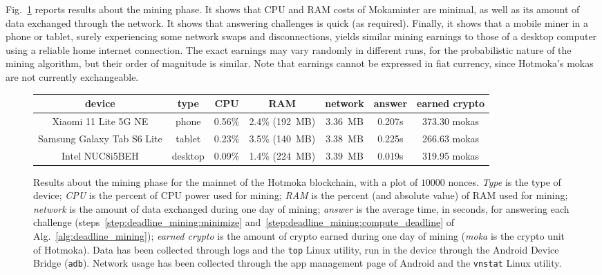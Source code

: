Fig.~\ref{fig:mining_phase_experiments} reports results about the mining phase.
It shows that CPU and RAM costs of Mokaminter are minimal, as well as its
amount of data exchanged through the network. It shows that answering challenges is quick (as required).
Finally, it shows that a mobile miner in a phone or tablet, surely experiencing some network swaps
and disconnections, yields similar mining earnings to those
of a desktop computer using a reliable home internet connection.
The exact earnings may vary
randomly in different runs, for the probabilistic
nature of the mining algorithm, but their order of magnitude is similar.
Note that earnings cannot be expressed in fiat
currency, since Hotmoka's mokas are not currently exchangeable.


\begin{figure}[t]
  \begin{center}
    \begin{tabular}{|c|c||c|c|c|c|c|}
      \hline
      \textbf{device} & \textbf{type} & \textbf{CPU} & \textbf{RAM} & \textbf{network} & \textbf{answer} & \textbf{earned crypto} \\\hline\hline
      Xiaomi 11 Lite 5G NE & phone & 0.56\% & 2.4\% (192~MB) & 3.36~MB & 0.207s & 373.30 mokas \\\hline
      Samsung Galaxy Tab S6 Lite & tablet & 0.23\% & 3.5\% (140~MB) & 3.38~MB & 0.225s & 266.63 mokas \\\hline
      Intel NUC8i5BEH & desktop & 0.09\% & 1.4\% (224~MB) & 3.39~MB & 0.019s & 319.95 mokas \\\hline
    \end{tabular}
  \end{center}
  \caption{Results about the mining phase for the mainnet of the Hotmoka blockchain,
    with a plot of $10000$ nonces.
    \emph{Type} is the type of device; \emph{CPU} is the
    percent of CPU power used for mining;
    \emph{RAM} is the percent (and absolute value) of
    RAM used for mining; \emph{network} is the amount of data exchanged during
    one day of mining;
    \emph{answer} is the average time, in seconds, for answering each challenge
    (steps~\ref{step:deadline_mining:minimize}
    and~\ref{step:deadline_mining:compute_deadline} of Alg.~\ref{alg:deadline_mining});
    \emph{earned crypto} is the amount of crypto
    earned during one day of mining (\emph{moka} is the crypto unit of Hotmoka). Data has been collected
    through logs and the \texttt{top} Linux utility, run in the device through the Android Device Bridge
    (\texttt{adb}). Network usage has been collected through the app management page of Android and
    the \texttt{vnstat} Linux utility.
  }
  \label{fig:mining_phase_experiments}
\end{figure}

